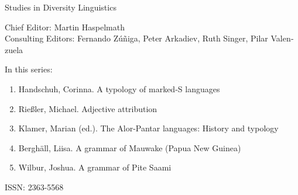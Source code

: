 {\large Studies in Diversity Linguistics}

\bigskip

Chief Editor: Martin Haspelmath \\
Consulting Editors: Fernando Zúñiga, Peter Arkadiev, Ruth Singer, Pilar Valen­zuela

\bigskip

In this series:

\begin{enumerate}
\item Handschuh, Corinna. A typology of marked-S languages
\item Rießler, Michael. Adjective attribution
\item Klamer, Marian (ed.). The Alor-Pantar languages: History and typology
\item Berghäll, Liisa. A grammar of Mauwake (Papua New Guinea)
\item Wilbur, Joshua. A grammar of Pite Saami
\end{enumerate}


\vfill

\gdef\lsISSN{2363-5568}%
\hfill ISSN: \lsISSN